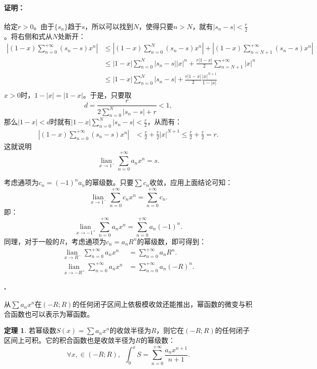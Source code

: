 \documentclass[12pt,UTF8]{ctexbook}
\newcommand{\lian}[1]{
    \underset{#1}{\operatorname{lian}\,}
}
\theoremstyle{definition}
\newtheorem{tm}{定理}[section]
\theoremstyle{plain}
\renewenvironment{proof}{\paragraph{\textbf{证明：}}}{\hfill$\square$}
\begin{document}
\begin{appendix}
\begin{proof}
    给定$r > 0$。由于$\{s_n\}$趋于$s$，所以可以找到$N$，使得只要$n>N$，就有$|s_n - s| < \frac{r}{2}$。将右侧和式从$N$处断开：
    \begin{align*}
        \left|(1 - x)\sum_{n=0}^{+\infty}(s_n - s) x^n \right| &\leqslant \left|(1 - x)\sum_{n=0}^{N}(s_n - s) x^n \right| + \left|(1 - x)\sum_{n=N+1}^{+\infty}(s_n - s) x^n \right| \\
        &\leqslant |1 - x| \sum_{n=0}^{N}|s_n - s||x|^n + \frac{r|1 - x|}{2}\sum_{n=N+1}^{+\infty} |x|^n \\
        &\leqslant |1 - x| \sum_{n=0}^{N}|s_n - s| + \frac{r|1 - x|}{2}\frac{|x|^{N+1}}{1 - |x|} \\
    \end{align*}
    $x>0$时，$1 - |x| = |1 - x|$。于是，只要取
    $$ d = \frac{r}{2\sum_{n=0}^{N}|s_n - s| + r} < 1,$$
    那么$|1 - x| < d$时就有$|1 - x| \sum_{n=0}^{N}|s_n - s| < \frac{r}{2}$，从而有：
    \begin{align*}
        \left|(1 - x)\sum_{n=0}^{+\infty}(s_n - s) x^n \right| &< \frac{r}{2} + \frac{r}{2} |x|^{N+1} \leqslant \frac{r}{2} + \frac{r}{2} = r.
    \end{align*}
    这就说明
    $$ \lian{x\to 1^-} \sum_{n=0}^{+\infty}a_n x^n = s. $$

    考虑通项为$c_n = (-1)^n a_n$的幂级数。只要$\sum c_n$收敛，应用上面结论可知：
    $$ \lian{x\to 1^-} \sum_{n=0}^{+\infty}c_n x^n = \sum_{n=0}^{+\infty} c_n. $$
    即：
    $$ \lian{x\to -1^+} \sum_{n=0}^{+\infty}a_n x^n = \sum_{n=0}^{+\infty} a_n (-1)^n. $$
    同理，对于一般的$R$，考虑通项为$c_n = a_n R^n$的幂级数，即可得到：
    \begin{align*}
        \lian{x\to R^-} \sum_{n=0}^{+\infty}a_n x^n &= \sum_{n=0}^{+\infty} a_n R^n. \tag{只需右边级数收敛} \\
        \lian{x\to -R^+} \sum_{n=0}^{+\infty}a_n x^n &= \sum_{n=0}^{+\infty} a_n (-R)^n. \tag{只需右边级数收敛} 
    \end{align*}

\end{proof}

从$\sum a_n x^n$在$(-R;R)$的任何闭子区间上依极模收敛还能推出，幂函数的微变与积合函数也可以表示为幂函数。

\begin{tm}
    若幂级数$S(x) = \sum a_n x^n$的收敛半径为$R$，则它在$(-R;R)$的任何闭子区间上可积。它的积合函数也是收敛半径为$R$的幂级数：
    $$ \forall x, \in (-R;R),\,\,\, \int_0^x S =  \sum_{n=0}^{+\infty} \frac{a_n x^{n+1}}{n + 1}. $$
\end{tm}


\end{appendix}
\end{document}
